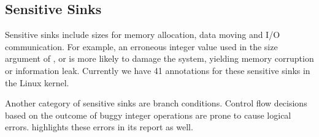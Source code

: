 \subsection{Sensitive Sinks}

Sensitive sinks include sizes for memory allocation, data moving and I/O
communication. For example, an erroneous integer value used in the size
argument of ,  or 
is more likely to damage the system, yielding memory corruption or information
leak. Currently we have 41 annotations for these sensitive sinks in the Linux
kernel.

Another category of sensitive sinks are branch conditions. Control flow
decisions based on the outcome of buggy integer operations are prone to cause
logical errors. \sys highlights these errors in its report as well.

